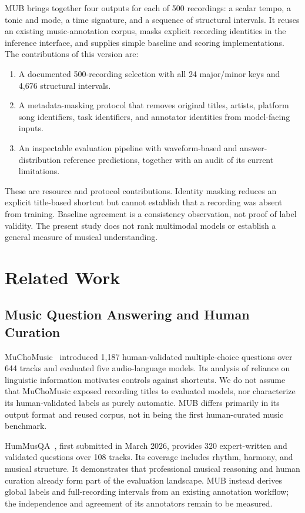 \documentclass[11pt,a4paper]{article}
\begin{document}
MUB brings together four outputs for each of 500 recordings: a scalar tempo, a tonic and mode, a time signature, and a sequence of structural intervals. It reuses an existing music-annotation corpus, masks explicit recording identities in the inference interface, and supplies simple baseline and scoring implementations. The contributions of this version are:
\begin{enumerate}
 \item A documented 500-recording selection with all 24 major/minor keys and 4,676 structural intervals.
 \item A metadata-masking protocol that removes original titles, artists, platform song identifiers, task identifiers, and annotator identities from model-facing inputs.
 \item An inspectable evaluation pipeline with waveform-based and answer-distribution reference predictions, together with an audit of its current limitations.
\end{enumerate}

These are resource and protocol contributions. Identity masking reduces an explicit title-based shortcut but cannot establish that a recording was absent from training. Baseline agreement is a consistency observation, not proof of label validity. The present study does not rank multimodal models or establish a general measure of musical understanding.

\section{Related Work}
\label{sec:related}
\subsection{Music Question Answering and Human Curation}
MuChoMusic~\cite{muchomusic} introduced 1,187 human-validated multiple-choice questions over 644 tracks and evaluated five audio-language models. Its analysis of reliance on linguistic information motivates controls against shortcuts. We do not assume that MuChoMusic exposed recording titles to evaluated models, nor characterize its human-validated labels as purely automatic. MUB differs primarily in its output format and reused corpus, not in being the first human-curated music benchmark.

HumMusQA~\cite{hummusqa}, first submitted in March 2026, provides 320 expert-written and validated questions over 108 tracks. Its coverage includes rhythm, harmony, and musical structure. It demonstrates that professional musical reasoning and human curation already form part of the evaluation landscape. MUB instead derives global labels and full-recording intervals from an existing annotation workflow; the independence and agreement of its annotators remain to be measured.
\end{document}
